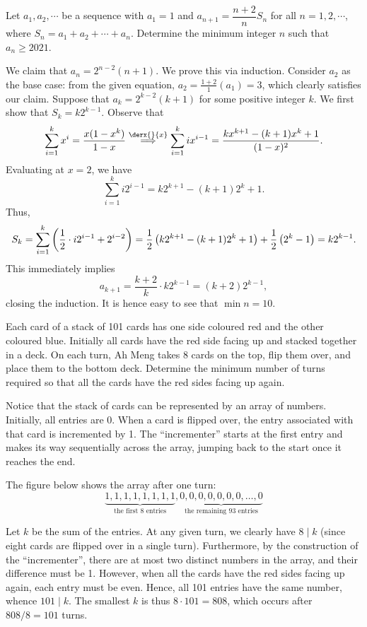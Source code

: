 \begin{question}[10]\label{Q::2021-O-1-16}
    Let $a_1, a_2, \cdots$ be a sequence with $a_1 = 1$ and $a_{n+1} = \dfrac{n+2}{n} S_n$ for all $n = 1, 2, \cdots$, where $S_n = a_1 + a_2 + \cdots + a_n$. Determine the minimum integer $n$ such that $a_n \geq 2021$.
\end{question}
\begin{solution*}
    We claim that $a_n = 2^{n-2} (n+1)$. We prove this via induction. Consider $a_2$ as the base case: from the given equation, $a_2 = \frac{1+2}{1}(a_1) = 3$, which clearly satisfies our claim. Suppose that $a_k = 2^{k-2} (k+1)$ for some positive integer $k$. We first show that $S_k = k2^{k-1}$. Observe that \[\sum_{i=1}^k x^i = \frac{x(1-x^k)}{1-x} \overset{\derx{}{x}}{\implies} \sum_{i = 1}^k ix^{i-1} = \frac{kx^{k+1} - (k+1)x^k + 1}{(1-x)^2}.\] Evaluating at $x = 2$, we have \[\sum_{i = 1}^k i2^{i-1} = k2^{k+1} - (k+1)2^k +1.\] Thus, \[S_k = \sum_{i=1}^k \left( \frac12 \cdot i2^{i-1} + 2^{i-2} \right) = \frac12\left( k2^{k+1} - (k+1)2^k +1 \right) + \frac12 \left( 2^k - 1 \right) = k2^{k-1}.\] This immediately implies \[a_{k+1} = \frac{k+2}{k} \cdot k2^{k-1} = (k+2)2^{k-1},\] closing the induction. It is hence easy to see that $\min n = 10$.
\end{solution*}

\begin{question}[101]\label{Q::2021-O-1-17}
    Each card of a stack of 101 cards has one side coloured red and the other coloured blue. Initially all cards have the red side facing up and stacked together in a deck. On each turn, Ah Meng takes 8 cards on the top, flip them over, and place them to the bottom deck. Determine the minimum number of turns required so that all the cards have the red sides facing up again.
\end{question}
\begin{solution*}
    Notice that the stack of cards can be represented by an array of numbers. Initially, all entries are 0. When a card is flipped over, the entry associated with that card is incremented by 1. The ``incrementer'' starts at the first entry and makes its way sequentially across the array, jumping back to the start once it reaches the end.

    The figure below shows the array after one turn: \[\underbrace{1,1,1,1,1,1,1,1}_{\text{the first 8 entries}},\underbrace{0,0,0,0,0,0,0,\ldots,0}_{\text{the remaining 93 entries}}\]
    
    Let $k$ be the sum of the entries. At any given turn, we clearly have $8 \mid k$ (since eight cards are flipped over in a single turn). Furthermore, by the construction of the ``incrementer'', there are at most two distinct numbers in the array, and their difference must be 1. However, when all the cards have the red sides facing up again, each entry must be even. Hence, all 101 entries have the same number, whence $101 \mid k$. The smallest $k$ is thus $8 \cdot 101 = 808$, which occurs after $808/8 = 101$ turns.
\end{solution*}

